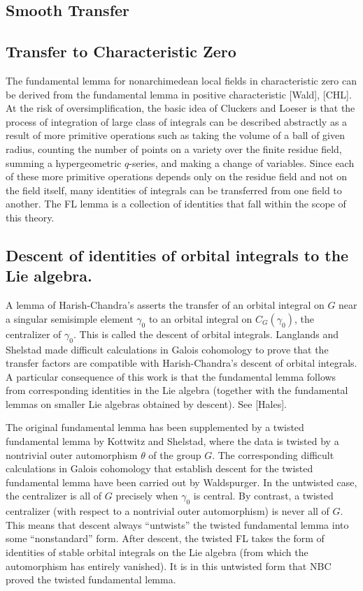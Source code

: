 \documentclass[brochure,english,12pt]{bourbaki}
\begin{document}
\subsection{Smooth Transfer}



\subsection{Transfer to Characteristic Zero}

The fundamental lemma for nonarchimedean local fields in
characteristic zero can be derived from the fundamental lemma in
positive characteristic [Wald], [CHL].  At the risk of
oversimplification, the basic idea of Cluckers and Loeser is that the
process of integration of large class of integrals can be described
abstractly as a result of more primitive operations such as taking the
volume of a ball of given radius, counting the number of points on a
variety over the finite residue field, summing a hypergeometric
$q$-series, and making a change of variables.  Since each of these
more primitive operations depends only on the residue field and not on
the field itself, many identities of integrals can be transferred from
one field to another.  The FL lemma is a collection of identities that
fall within the scope of this theory.

\subsection{Descent of identities of orbital integrals to the Lie algebra.}

A lemma of Harish-Chandra's asserts the transfer of an orbital
integral on $G$ near a singular semisimple element $\gamma_0$ to an
orbital integral on $C_G(\gamma_0)$, the centralizer of $\gamma_0$.
This is called the descent of orbital integrals.  Langlands and
Shelstad made difficult calculations in Galois cohomology to prove
that the transfer factors are compatible with Harish-Chandra's descent
of orbital integrals.  A particular consequence of this work is that
the fundamental lemma follows from corresponding identities in the Lie
algebra (together with the fundamental lemmas on smaller Lie algebras
obtained by descent).  See [Hales].

The original fundamental lemma has been supplemented by a twisted
fundamental lemma by Kottwitz and Shelstad, where the data is twisted
by a nontrivial outer automorphism $\theta$ of the group $G$.  The
corresponding difficult calculations in Galois cohomology that
establish descent for the twisted fundamental lemma have been carried
out by Waldspurger.  In the untwisted case, the centralizer is all of
$G$ precisely when $\gamma_0$ is central.  By contrast, a twisted
centralizer (with respect to a nontrivial outer automorphism) is never
all of $G$.  This means that descent always ``untwists'' the twisted
fundamental lemma into some ``nonstandard'' form.  After descent, the twisted FL
takes the form of identities of stable orbital
integrals on the Lie algebra (from which the automorphism has entirely
vanished).  It is in this untwisted form that NBC proved the twisted
fundamental lemma.
\end{document}
